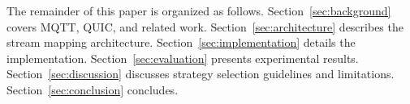 The remainder of this paper is organized as follows. Section~\ref{sec:background} covers MQTT, QUIC, and related work. Section~\ref{sec:architecture} describes the stream mapping architecture. Section~\ref{sec:implementation} details the implementation. Section~\ref{sec:evaluation} presents experimental results. Section~\ref{sec:discussion} discusses strategy selection guidelines and limitations. Section~\ref{sec:conclusion} concludes.
